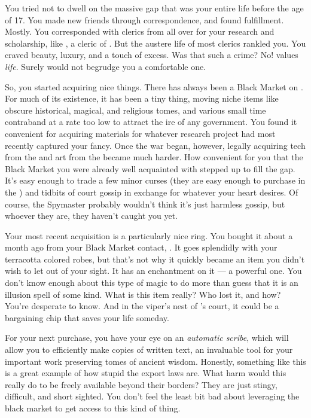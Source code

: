 \documentclass[char]{GL2020}
\begin{document}
You tried not to dwell on the massive gap that was your entire life before the age of 17. You made new friends through correspondence, and found fulfillment. Mostly. You corresponded with clerics from all over for your research and scholarship, like \cEbbPriest{\full}, a cleric of \cEbb{}. But the austere life of most clerics rankled you. You craved beauty, luxury, and a touch of excess. Was that such a crime? No! \cFarmGod{} values \emph{life}. Surely \cFarmGod{\They} would not begrudge you a comfortable one.

So, you started acquiring nice things. There has always been a Black Market on \pEarth{}. For much of its existence, it has been a tiny thing, moving niche items like obscure historical, magical, and religious tomes, and various small time contraband at a rate too low to attract the ire of any government. You found it convenient for acquiring materials for whatever research project had most recently captured your fancy. Once the war began, however, legally acquiring tech from the \pTech{} and art from the \pShip{} became much harder. How convenient for you that the Black Market you were already well acquainted with stepped up to fill the gap. It's easy enough to trade a few minor curses (they are easy enough to purchase in the \pFarm{}) and tidbits of court gossip in exchange for whatever your heart desires. Of course, the \pFarm{} Spymaster probably wouldn't think it's just harmless gossip, but whoever they are, they haven't caught you yet.

Your most recent acquisition is a particularly nice ring. You bought it about a month ago from your Black Market contact, \cChupSecond{\full}. It goes splendidly with your terracotta colored robes, but that’s not why it quickly became an item you didn’t wish to let out of your sight. It has an enchantment on it — a powerful one. You don’t know enough about this type of magic to do more than guess that it is an illusion spell of some kind. What is this item really? Who lost it, and how? You’re desperate to know. And in the viper’s nest of \cQueen{\Majesty} \cQueen{}’s court, it could be a bargaining chip that saves your life someday.

For your next purchase, you have your eye on an \emph{automatic scribe}, which will allow you to efficiently make copies of written text, an invaluable tool for your important work preserving tomes of ancient wisdom. Honestly, something like this is a great example of how stupid the \pTech{} export laws are. What harm would this really do to be freely available beyond their borders? They are just stingy, difficult, and short sighted. You don’t feel the least bit bad about leveraging the black market to get access to this kind of thing.
\end{document}

